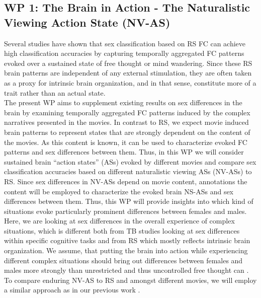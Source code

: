 \documentclass[11pt,a4paper]{article}
\begin{document}
\subsection*{WP 1: The Brain in Action - The Naturalistic Viewing Action State (NV-AS) }
Several studies have shown that sex classification based on RS FC can achieve high classification accuracies 
\parencite{casanovaCombiningGraphMachine2012a,ritchieSexDifferencesAdult2018, weisSexClassificationResting2020a,wierschAccurateSexPrediction2023a,wierschSexDifferencesBrain2021a} 
by capturing temporally aggregated FC patterns evoked over a sustained state of free thought or mind wandering. 
Since these RS brain patterns are independent of any external stimulation, they are often taken as a proxy 
for intrinsic brain organization, and in that sense, constitute more of a trait rather than an actual state.\\ 
The present WP aims to supplement existing results on sex differences in the brain by examining temporally 
aggregated FC patterns induced by the complex narratives presented in the movies. In contrast to RS, 
we expect movie induced brain patterns to represent states that are strongly dependent on the content of the movies. 
As this content is known, it can be used to characterize evoked FC patterns and sex differences between them. 
Thus, in this WP we will consider sustained brain “action states” (ASs) evoked by different movies and 
compare sex classification accuracies based on different naturalistic viewing ASs (NV-ASs) to RS. 
Since sex differences in NV-ASs depend on movie content, annotations the content will be employed to 
characterize the evoked brain NS-ASs and sex differences between them. 
Thus, this WP will provide insights 
into which kind of situations evoke particularly prominent differences between females and males. Here, we are 
looking at sex differences in the overall experience of complex situations, which is different both from TB 
studies looking at sex differences within specific cognitive tasks and from RS which mostly reflects intrinsic 
brain organization. We assume, that putting the brain into action while experiencing different complex situations 
should bring out differences between females and males more strongly than unrestricted and thus uncontrolled 
free thought can \parencite{vanderwalIndividualDifferencesFunctional2017}.\\
To compare enduring NV-AS to RS and amongst different movies, we will employ a similar approach as 
in our previous work \parencite{weisSexClassificationResting2020a}.\\ 
\end{document}
